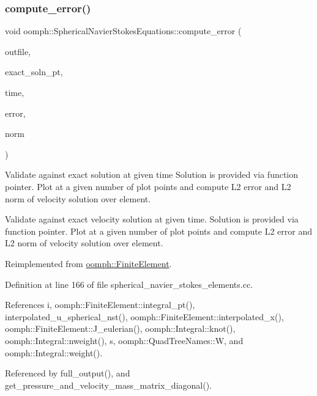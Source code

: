 \subsubsection{\texorpdfstring{compute\+\_\+error()}{compute\_error()}\hspace{0.1cm}{\footnotesize\ttfamily [1/2]}}
{\footnotesize\ttfamily void oomph\+::\+Spherical\+Navier\+Stokes\+Equations\+::compute\+\_\+error (\begin{DoxyParamCaption}\item[{std\+::ostream \&}]{outfile,  }\item[{\hyperlink{classoomph_1_1FiniteElement_ad4ecf2b61b158a4b4d351a60d23c633e}{Finite\+Element\+::\+Unsteady\+Exact\+Solution\+Fct\+Pt}}]{exact\+\_\+soln\+\_\+pt,  }\item[{const double \&}]{time,  }\item[{double \&}]{error,  }\item[{double \&}]{norm }\end{DoxyParamCaption})\hspace{0.3cm}{\ttfamily [virtual]}}



Validate against exact solution at given time Solution is provided via function pointer. Plot at a given number of plot points and compute L2 error and L2 norm of velocity solution over element. 

Validate against exact velocity solution at given time. Solution is provided via function pointer. Plot at a given number of plot points and compute L2 error and L2 norm of velocity solution over element. 

Reimplemented from \hyperlink{classoomph_1_1FiniteElement_a7f67853506dc73fa6b7505108de22d1f}{oomph\+::\+Finite\+Element}.



Definition at line 166 of file spherical\+\_\+navier\+\_\+stokes\+\_\+elements.\+cc.



References i, oomph\+::\+Finite\+Element\+::integral\+\_\+pt(), interpolated\+\_\+u\+\_\+spherical\+\_\+nst(), oomph\+::\+Finite\+Element\+::interpolated\+\_\+x(), oomph\+::\+Finite\+Element\+::\+J\+\_\+eulerian(), oomph\+::\+Integral\+::knot(), oomph\+::\+Integral\+::nweight(), s, oomph\+::\+Quad\+Tree\+Names\+::W, and oomph\+::\+Integral\+::weight().



Referenced by full\+\_\+output(), and get\+\_\+pressure\+\_\+and\+\_\+velocity\+\_\+mass\+\_\+matrix\+\_\+diagonal().

